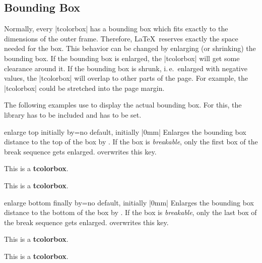 \clearpage
\subsection{Bounding Box}
Normally, every |tcolorbox| has a bounding box which fits exactly to the
dimensions of the outer frame. Therefore, \LaTeX\ reserves exactly the space
needed for the box.
This behavior can be changed by enlarging (or shrinking) the bounding box.
If the bounding box is enlarged, the |tcolorbox| will get some clearance
around it. If the bounding box is shrunk, i.\,e.\ enlarged with negative
values, the |tcolorbox| will overlap to other parts of the page.
For example, the |tcolorbox| could be stretched into the page margin.

\begin{marker}
The following examples use  to display the
actual bounding box. For this, the library  has to be included and
 has to be set.
\end{marker}

\begin{docTcbKey}{enlarge top initially by}{=}{no default, initially |0mm|}
  Enlarges the bounding box distance to the top of the box by .
  If the box is \emph{breakable}, only the first box of the break sequence
  gets enlarged.  overwrites this key.
\begin{dispExample}

\begin{tcolorbox}[enlarge top initially by=-5mm]
This is a \textbf{tcolorbox}.
\end{tcolorbox}
\begin{tcolorbox}[enlarge top initially by=5mm,enhanced,show bounding box]
This is a \textbf{tcolorbox}.
\end{tcolorbox}
\end{dispExample}
\end{docTcbKey}



\begin{docTcbKey}{enlarge bottom finally by}{=}{no default, initially |0mm|}
  Enlarges the bounding box distance to the bottom of the box by .
  If the box is \emph{breakable}, only the last box of the break sequence
  gets enlarged.  overwrites this key.
\begin{dispExample}

\begin{tcolorbox}[enlarge bottom finally by=5mm]
This is a \textbf{tcolorbox}.
\end{tcolorbox}
\begin{tcolorbox}[enlarge bottom finally by=-5mm,enhanced,show bounding box]
This is a \textbf{tcolorbox}.
\end{tcolorbox}
\end{dispExample}
\end{docTcbKey}

